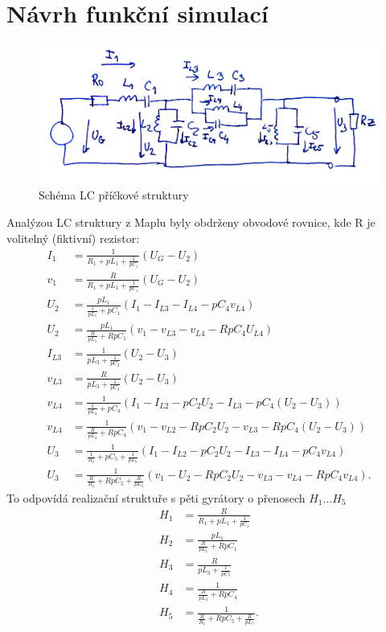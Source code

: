 \documentclass[twoside]{article}
\begin{document}
\section{Návrh funkční simulací}
\begin{figure}[H]
\centering
\includegraphics[scale=0.08]{LCstruktura.png}
\caption{Schéma LC příčkové struktury}
\end{figure}
\noindent Analýzou LC struktury z Maplu byly obdrženy obvodové rovnice, kde R je volitelný (fiktivní) rezistor:
\begin{align}
I_1 &= \frac{1}{R_1 + pL_1 + \frac{1}{pC_1}}(U_G - U_2)\\
v_1 & = \frac{R}{R_1 + pL_1 + \frac{1}{pC_1}}(U_G - U_2)\\
U_2 &= \frac{pL_1}{\frac{1}{pL_1} + pC_1}(I_1 - I_{L3} - I_{L4} - pC_4 v_{L4})\\
U_2 &= \frac{pL_1}{\frac{R}{pL_1} + RpC_1}(v_1 - v_{L3} - v_{L4} - RpC_4 U_{L4})\\
I_{L3} &= \frac{1}{pL_3 + \frac{1}{pC_3}}(U_2 - U_3)\\
v_{L3} &= \frac{R}{pL_3 + \frac{1}{pC_3}}(U_2 - U_3)\\
v_{L4} &= \frac{1}{\frac{1}{pL_4}+pC_4}(I_1 - I_{L2} - pC_2U_2 - I_{L3} - pC_4 (U_2 - U_3))\\
v_{L4} &= \frac{1}{\frac{R}{pL_4}+RpC_4}(v_1 - v_{L2} - RpC_2U_2 - v_{L3} - RpC_4 (U_2 - U_3))\\
U_3 &= \frac{1}{\frac{1}{R_z}+pC_5 + \frac{1}{pL_5}}(I_1 - I_{L2} - pC_2U_2 - I_{L3} - I_{L4} - pC_4 v_{L4})\\
U_3 &= \frac{1}{\frac{R}{R_z}+RpC_5 + \frac{R}{pL_5}}(v_1 - U_2 - RpC_2 U_2 - v_{L3} - v_{L4} - RpC_4 v_{L4}).
\end{align}
\noindent To odpovídá realizační struktuře s pěti gyrátory o přenosech $H_1...H_5$
\begin{align}
H_1 & = \frac{R}{R_1 + pL_1 + \frac{1}{pC_1}}\\
H_2 &= \frac{pL_1}{\frac{R}{pL_1} + RpC_1}\\
H_3 &= \frac{R}{pL_3 + \frac{1}{pC_3}}\\
H_4 &= \frac{1}{\frac{R}{pL_4}+RpC_4}\\
H_5 &= \frac{1}{\frac{R}{R_z}+RpC_5 + \frac{R}{pL_5}}.
\end{align}
\end{document}

